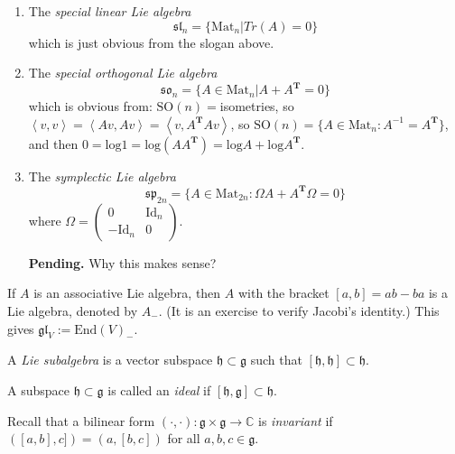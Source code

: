 \begin{example}
\label{example-Lie-algebras}
\begin{enumerate}
\item The {\it special linear Lie algebra} 
$$
\mathfrak{sl}_n=\{\text{Mat}_n|Tr(A)=0\}
$$
which is just obvious from the slogan above.
\item The {\it special orthogonal Lie algebra} 
$$
\mathfrak{so}_n=\{A\in \text{Mat}_n|A+A^{\mathbf{T}}=0\}
$$
which is obvious from: $\text{SO}(n)=$isometries, so
$\left<v,v\right>=\left<Av,Av\right>=\left<v,A^{\mathbf{T}}Av\right>$, so
$\text{SO}(n)=\{A \in \text{Mat}_n:A^{-1}=A^{\mathbf{T}}\}$, and then
$0=
\text{log}1=\text{log}(A A^{\mathbf{T}})=\text{log}A+\text{log}A^{\mathbf{T}}$.

\item The {\it symplectic Lie algebra}
$$
\mathfrak{sp}_{2n}=\{A \in \text{Mat}_{2n}:\Omega A+A^{\mathbf{T}}\Omega=0\}
$$
where $\Omega=\begin{pmatrix}
0&\text{Id}_n\\ 
-\text{Id}_n & 0
\end{pmatrix}$.

{\bf Pending.} Why this makes sense?
\end{enumerate}
\end{example}

\begin{example}
\label{example-associative-algebra-gives-Lie-algebra}
If $A$ is an associative Lie algebra, then $A$ with the bracket  $[a,b]=ab-ba$
is a Lie algebra, denoted by  $A_-$. (It is an exercise to verify Jacobi's
identity.) This gives  $\mathfrak{gl}_V:=\text{End}(V)_-$.
\end{example}

\begin{definition}
\label{definition-Lie-subalgebra}
A {\it Lie subalgebra} is a vector subspace $\mathfrak{h} \subset \mathfrak{g}$
such that $[\mathfrak{h},\mathfrak{h}] \subset \mathfrak{h}$.
\end{definition}

\begin{definition}
\label{definition-ideal}
A subspace $\mathfrak{h}\subset \mathfrak{g}$ is called an {\it ideal} if
$[\mathfrak{h},\mathfrak{g}]\subset\mathfrak{h}$.
\end{definition}

\medskip\noindent
Recall that a bilinear form
$(\cdot,\cdot):\mathfrak{g}\times\mathfrak{g}\to \mathbb{C}$ is {\it invariant}
if $([a,b],c])=(a,[b,c])$ for all  $a,b,c \in \mathfrak{g}$.

